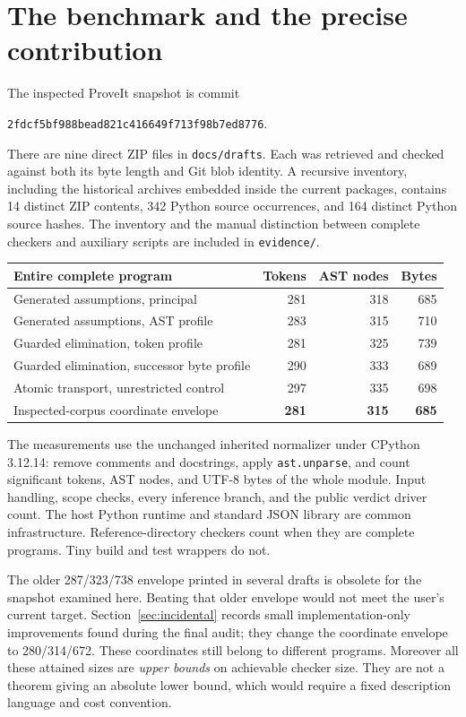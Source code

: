 \documentclass[11pt,letterpaper]{article}
\theoremstyle{definition}\newtheorem{definition}[theorem]{Definition}
\theoremstyle{remark}\newtheorem{remark}[theorem]{Remark}
\newcommand{\file}[1]{{\small\nolinkurl{#1}}}
\begin{document}
\section{The benchmark and the precise contribution}
\label{sec:benchmark}

The inspected ProveIt snapshot is commit
\begin{center}\file{2fdcf5bf988bead821c416649f713f98b7ed8776}.\end{center}
There are nine direct ZIP files in \file{docs/drafts}. Each was retrieved
and checked against both its byte length and Git blob identity. A
recursive inventory, including the historical archives embedded inside
the current packages, contains 14 distinct ZIP contents, 342 Python
source occurrences, and 164 distinct Python source hashes. The inventory
and the manual distinction between complete checkers and auxiliary
scripts are included in \file{evidence/}.

\begin{center}\small
\begin{tabular}{lrrr}
\toprule
Entire complete program & Tokens & AST nodes & Bytes\\
\midrule
Generated assumptions, principal &281&318&685\\
Generated assumptions, AST profile &283&315&710\\
Guarded elimination, token profile &281&325&739\\
Guarded elimination, successor byte profile &290&333&689\\
Atomic transport, unrestricted control &297&335&698\\
\midrule
Inspected-corpus coordinate envelope &\textbf{281}&\textbf{315}&\textbf{685}\\
\bottomrule
\end{tabular}
\end{center}

The measurements use the unchanged inherited normalizer under CPython
3.12.14: remove comments and docstrings, apply \texttt{ast.unparse}, and
count significant tokens, AST nodes, and UTF-8 bytes of the whole
module. Input handling, scope checks, every inference branch, and the
public verdict driver count. The host Python runtime and standard JSON
library are common infrastructure. Reference-directory checkers count
when they are complete programs. Tiny build and test wrappers do not.

The older 287/323/738 envelope printed in several drafts is obsolete
for the snapshot examined here. Beating that older envelope would not
meet the user's current target. Section~\ref{sec:incidental} records
small implementation-only improvements found during the final audit;
they change the coordinate envelope to 280/314/672. These coordinates
still belong to different programs. Moreover all these attained sizes are
\emph{upper bounds} on achievable checker size. They are not a theorem
giving an absolute lower bound, which would require a fixed description
language and cost convention.
\end{document}
